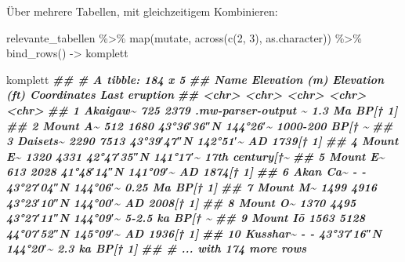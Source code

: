 \documentclass[
  ngerman,
]{article}
\newenvironment{Shaded}{\begin{snugshade}}{\end{snugshade}}
\newcommand{\DecValTok}[1]{\textcolor[rgb]{0.00,0.00,0.81}{#1}}
\newcommand{\DocumentationTok}[1]{\textcolor[rgb]{0.56,0.35,0.01}{\textbf{\textit{#1}}}}
\newcommand{\FunctionTok}[1]{\textcolor[rgb]{0.00,0.00,0.00}{#1}}
\newcommand{\NormalTok}[1]{#1}
\newcommand{\OtherTok}[1]{\textcolor[rgb]{0.56,0.35,0.01}{#1}}
\newcommand{\SpecialCharTok}[1]{\textcolor[rgb]{0.00,0.00,0.00}{#1}}
\begin{document}
Über mehrere Tabellen, mit gleichzeitigem Kombinieren:

\begin{Shaded}
\begin{Highlighting}[]
\NormalTok{relevante\_tabellen }\SpecialCharTok{\%\textgreater{}\%}
  \FunctionTok{map}\NormalTok{(mutate, }\FunctionTok{across}\NormalTok{(}\FunctionTok{c}\NormalTok{(}\DecValTok{2}\NormalTok{, }\DecValTok{3}\NormalTok{), as.character)) }\SpecialCharTok{\%\textgreater{}\%}
  \FunctionTok{bind\_rows}\NormalTok{() }\OtherTok{{-}\textgreater{}}\NormalTok{ komplett}

\NormalTok{komplett}
\DocumentationTok{\#\# \# A tibble: 184 x 5}
\DocumentationTok{\#\#    Name     \textasciigrave{}Elevation (m)\textasciigrave{} \textasciigrave{}Elevation (ft)\textasciigrave{} Coordinates         \textasciigrave{}Last eruption\textasciigrave{}}
\DocumentationTok{\#\#    \textless{}chr\textgreater{}    \textless{}chr\textgreater{}           \textless{}chr\textgreater{}            \textless{}chr\textgreater{}               \textless{}chr\textgreater{}          }
\DocumentationTok{\#\#  1 Akaigaw\textasciitilde{} 725             2379             .mw{-}parser{-}output \textasciitilde{} 1.3 Ma BP[† 1] }
\DocumentationTok{\#\#  2 Mount A\textasciitilde{} 512             1680             43°36′36″N 144°26′\textasciitilde{} 1000{-}200 BP[† \textasciitilde{}}
\DocumentationTok{\#\#  3 Daisets\textasciitilde{} 2290            7513             43°39′47″N 142°51′\textasciitilde{} AD 1739[† 1]   }
\DocumentationTok{\#\#  4 Mount E\textasciitilde{} 1320            4331             42°47′35″N 141°17′\textasciitilde{} 17th century[†\textasciitilde{}}
\DocumentationTok{\#\#  5 Mount E\textasciitilde{} 613             2028             41°48′14″N 141°09′\textasciitilde{} AD 1874[† 1]   }
\DocumentationTok{\#\#  6 Akan Ca\textasciitilde{} {-}               {-}                43°27′04″N 144°06′\textasciitilde{} 0.25 Ma BP[† 1]}
\DocumentationTok{\#\#  7 Mount M\textasciitilde{} 1499            4916             43°23′10″N 144°00′\textasciitilde{} AD 2008[† 1]   }
\DocumentationTok{\#\#  8 Mount O\textasciitilde{} 1370            4495             43°27′11″N 144°09′\textasciitilde{} 5{-}2.5 ka BP[† \textasciitilde{}}
\DocumentationTok{\#\#  9 Mount Iō 1563            5128             44°07′52″N 145°09′\textasciitilde{} AD 1936[† 1]   }
\DocumentationTok{\#\# 10 Kusshar\textasciitilde{} {-}               {-}                43°37′16″N 144°20′\textasciitilde{} 2.3 ka BP[† 1] }
\DocumentationTok{\#\# \# ... with 174 more rows}
\end{Highlighting}
\end{Shaded}
\end{document}
